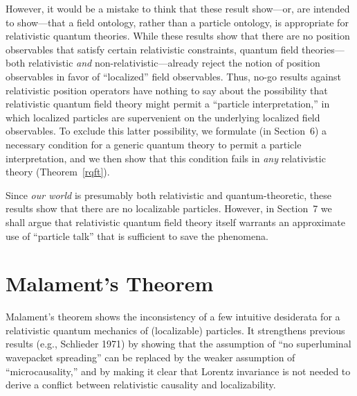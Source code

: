 \documentclass[11pt]{article}
\theoremstyle{remark}
\begin{document}
However, it would be a mistake to think that these result show---or,
are intended to show---that a field ontology, rather than a particle
ontology, is appropriate for relativistic quantum theories.  While
these results show that there are no position observables that satisfy
certain relativistic constraints, quantum field theories---both
relativistic \emph{and} non-relativistic---already reject the notion
of position observables in favor of ``localized'' field observables.
Thus, no-go results against relativistic position operators have
nothing to say about the possibility that relativistic quantum field
theory might permit a ``particle interpretation,'' in which localized
particles are supervenient on the underlying localized field
observables.  To exclude this latter possibility, we formulate (in
Section~6) a necessary condition for a generic quantum theory to
permit a particle interpretation, and we then show that this condition
fails in \emph{any} relativistic theory (Theorem~\ref{rqft}).

Since \emph{our world} is presumably both relativistic and
quantum-theoretic, these results show that there are no localizable
particles.  However, in Section~7 we shall argue that relativistic
quantum field theory itself warrants an approximate use of ``particle
talk'' that is sufficient to save the phenomena.

\section{Malament's Theorem}
Malament's theorem shows the inconsistency of a few intuitive
desiderata for a relativistic quantum mechanics of (localizable)
particles.  It strengthens previous results (e.g., Schlieder 1971) by
showing that the assumption of ``no superluminal wavepacket
spreading'' can be replaced by the weaker assumption of
``microcausality,'' and by making it clear that Lorentz invariance is
not needed to derive a conflict between relativistic causality and
localizability.
\end{document}
